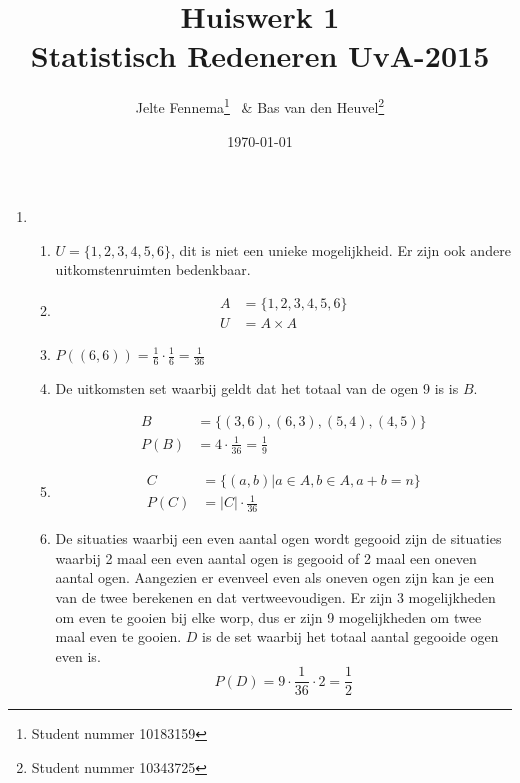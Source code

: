 \documentclass{article}
\title{Huiswerk 1\\ \large{Statistisch Redeneren UvA-2015}}
\author{Jelte Fennema\thanks{Student nummer 10183159} ~\& Bas van den
Heuvel\thanks{Student nummer 10343725}}
\date{\today}
\begin{document}
\maketitle

\begin{enumerate}
    \item
        \begin{enumerate}
            \item
                $U = \{1,2,3,4,5,6\}$, dit is niet een unieke mogelijkheid. Er
                zijn ook andere uitkomstenruimten bedenkbaar.

            \item
                \begin{align*}
                    A &= \{1,2,3,4,5,6\}\\
                    U&=A \times A
                \end{align*}

            \item
                $P((6,6)) = \frac16 \cdot \frac16 = \frac1{36}$

            \item
                De uitkomsten set waarbij geldt dat het totaal van de ogen 9 is
                is $B$.

                \begin{align*}
                    B &= \{(3,6), (6,3), (5,4), (4,5)\}\\
                    P(B)&= 4\cdot\frac1{36}=\frac19
                \end{align*}

            \item
                \begin{align*}
                    C &= \{(a, b) | a \in A, b \in A, a+b = n\}\\
                    P(C)&= |C| \cdot \frac1{36}
                \end{align*}

            \item De situaties waarbij een even aantal ogen wordt gegooid zijn
                de situaties waarbij 2 maal een even aantal ogen is gegooid of 2
                maal een oneven aantal ogen. Aangezien er evenveel even als
                oneven ogen zijn kan je een van de twee berekenen en dat
                vertweevoudigen. Er zijn 3 mogelijkheden om even te gooien bij
                elke worp, dus er zijn 9 mogelijkheden om twee maal even te
                gooien. $D$ is de set waarbij het totaal aantal gegooide ogen even
                is.
                $$
                P(D) = 9 \cdot \frac1{36} \cdot 2 = \frac12
                $$


\end{enumerate}
\end{enumerate}
\end{document}
